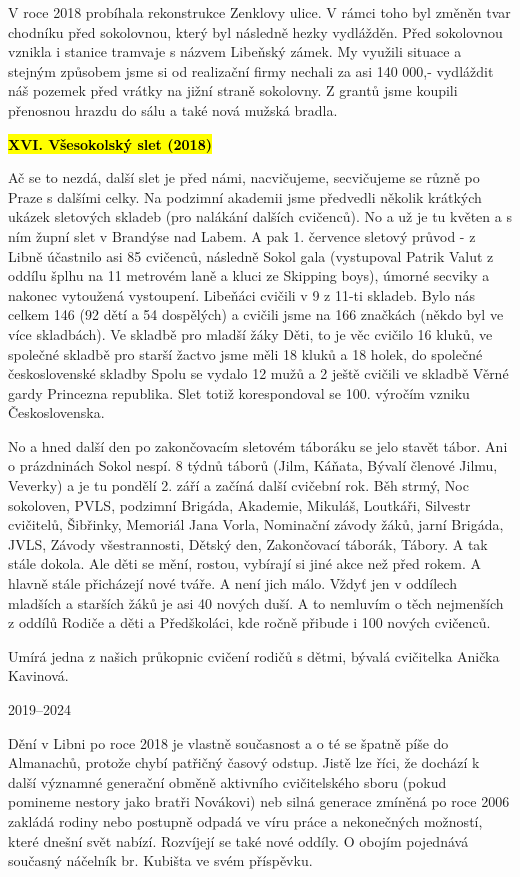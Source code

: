 V roce 2018 probíhala rekonstrukce Zenklovy ulice. V rámci toho byl
změněn tvar chodníku před sokolovnou, který byl následně hezky
vydlážděn. Před sokolovnou vznikla i stanice tramvaje s názvem Libeňský
zámek. My využili situace a stejným způsobem jsme si od realizační firmy
nechali za asi 140 000,- vydláždit náš pozemek před vrátky na jižní
straně sokolovny. Z grantů jsme koupili přenosnou hrazdu do sálu a také
nová mužská bradla.

\textbf{\hl{XVI. Všesokolský slet (2018)}}

Ač se to nezdá, další slet je před námi, nacvičujeme, secvičujeme se
různě po Praze s dalšími celky. Na podzimní akademii jsme předvedli
několik krátkých ukázek sletových skladeb (pro nalákání dalších
cvičenců). No a už je tu květen a s ním župní slet v Brandýse nad Labem.
A pak 1. července sletový průvod - z Libně účastnilo asi 85 cvičenců,
následně Sokol gala (vystupoval Patrik Valut z oddílu šplhu na 11
metrovém laně a kluci ze Skipping boys), úmorné secviky a nakonec
vytoužená vystoupení. Libeňáci cvičili v 9 z 11-ti skladeb. Bylo nás
celkem 146 (92 dětí a 54 dospělých) a cvičili jsme na 166 značkách
(někdo byl ve více skladbách). Ve skladbě pro mladší žáky Děti, to je
věc cvičilo 16 kluků, ve společné skladbě pro starší žactvo jsme měli 18
kluků a 18 holek, do společné československé skladby Spolu se vydalo 12
mužů a 2 ještě cvičili ve skladbě Věrné gardy Princezna republika. Slet
totiž korespondoval se 100. výročím vzniku Československa.

No a hned další den po zakončovacím sletovém táboráku se jelo stavět
tábor. Ani o prázdninách Sokol nespí. 8 týdnů táborů (Jilm, Káňata,
Bývalí členové Jilmu, Veverky) a je tu pondělí 2. září a začíná další
cvičební rok. Běh strmý, Noc sokoloven, PVLS, podzimní Brigáda,
Akademie, Mikuláš, Loutkáři, Silvestr cvičitelů, Šibřinky, Memoriál Jana
Vorla, Nominační závody žáků, jarní Brigáda, JVLS, Závody všestrannosti,
Dětský den, Zakončovací táborák, Tábory. A tak stále dokola. Ale děti se
mění, rostou, vybírají si jiné akce než před rokem. A hlavně stále
přicházejí nové tváře. A není jich málo. Vždyť jen v oddílech mladších a
starších žáků je asi 40 nových duší. A to nemluvím o těch nejmenších z
oddílů Rodiče a děti a Předškoláci, kde ročně přibude i 100 nových
cvičenců.

Umírá jedna z našich průkopnic cvičení rodičů s dětmi, bývalá cvičitelka
Anička Kavinová.

2019--2024

Dění v Libni po roce 2018 je vlastně současnost a o té se špatně píše do
Almanachů, protože chybí patřičný časový odstup. Jistě lze říci, že
dochází k další významné generační obměně aktivního cvičitelského sboru
(pokud pomineme nestory jako bratři Novákovi) neb silná generace zmíněná
po roce 2006 zakládá rodiny nebo postupně odpadá ve víru práce a
nekonečných možností, které dnešní svět nabízí. Rozvíjejí se také nové
oddíly. O obojím pojednává současný náčelník br. Kubišta ve svém
příspěvku.

